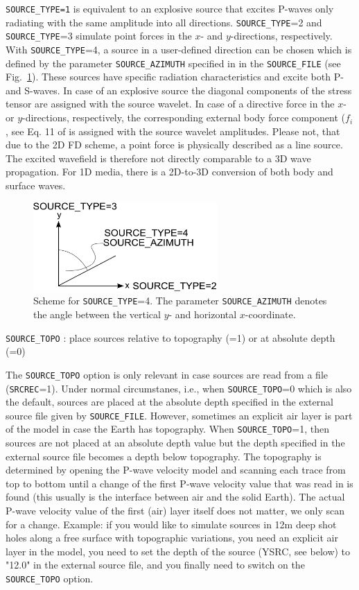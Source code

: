 \texttt{SOURCE\_TYPE=1} is equivalent to an explosive source that excites P-waves only radiating with the same amplitude into all directions. \texttt{SOURCE\_TYPE}=2 and \texttt{SOURCE\_TYPE}=3 simulate point forces in the $x$- and $y$-directions, respectively. With \texttt{SOURCE\_TYPE}=4, a source in a user-defined direction can be chosen which is defined by the parameter \texttt{SOURCE\_AZIMUTH} specified in in the \texttt{SOURCE\_FILE} (see Fig.~\ref{fig_source_azimuth}). These sources have specific radiation characteristics and excite both P- and S-waves. In case of an explosive source the diagonal components of the stress tensor are assigned with the source wavelet. In case of a directive force in the $x$- or $y$-directions, respectively, the corresponding external body force component ($f_i$, see Eq. 11 of \citep{bohlen:02} is assigned with the source wavelet amplitudes. Please not, that due to the 2D FD scheme, a point force is physically described as a line source. The excited wavefield is therefore not directly comparable to a 3D wave propagation. For 1D media, there is a 2D-to-3D conversion of both body and surface waves.
\begin{figure}[ht!]
\centering
    \includegraphics[width=7cm,angle=0]{figures/source_azimuth.pdf}
    \caption{Scheme for \texttt{SOURCE\_TYPE}=4. The parameter \texttt{SOURCE\_AZIMUTH} denotes the angle between the vertical $y$- and horizontal $x$-coordinate.}
    \label{fig_source_azimuth}
\end{figure}

\texttt{SOURCE\_TOPO} : place sources relative to topography (=1) or at absolute depth (=0)

The \texttt{SOURCE\_TOPO} option is only relevant in case sources are read from a file (\texttt{SRCREC}=1). Under normal circumstanes, i.e., when \texttt{SOURCE\_TOPO}=0 which is also the default, sources are placed at the absolute depth specified in the external source file given by \texttt{SOURCE\_FILE}. However, sometimes an explicit air layer is part of the model in case the Earth has topography. When \texttt{SOURCE\_TOPO}=1, then sources are not placed at an absolute depth value but the depth specified in the external source file becomes a depth below topography. The topography is determined by opening the P-wave velocity model and scanning each trace from top to bottom until a change of the first P-wave velocity value that was read in is found (this usually is the interface between air and the solid Earth). The actual P-wave velocity value of the first (air) layer itself does not matter, we only scan for a change. Example: if you would like to simulate sources in 12\;m deep shot holes along a free surface with topographic variations, you need an explicit air layer in the model, you need to set the depth of the source (YSRC, see below) to "12.0" in the external source file, and you finally need to switch on the \texttt{SOURCE\_TOPO} option.

